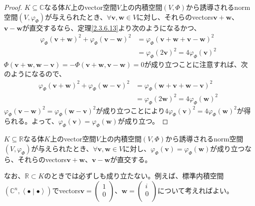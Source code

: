\documentclass[dvipdfmx]{jsarticle}
\begin{document}
\begin{proof}
$K \subseteq \mathbb{C}$なる体$K$上のvector空間$V$上の内積空間$(V,\varPhi)$から誘導されるnorm空間$\left( V,\varphi_{\varPhi} \right)$が与えられたとき、$\forall\mathbf{v},\mathbf{w} \in V$に対し、それらのvectors$\mathbf{v} + \mathbf{w}$、$\mathbf{v} - \mathbf{w}$が直交するなら、定理\ref{2.3.6.13}より次のようになるかつ、
\begin{align*}
{\varphi_{\varPhi}\left( \mathbf{v} + \mathbf{w} \right)}^{2} + {\varphi_{\varPhi}\left( \mathbf{v} - \mathbf{w} \right)}^{2} &= {\varphi_{\varPhi}\left( \mathbf{v} + \mathbf{w} + \mathbf{v} - \mathbf{w} \right)}^{2}\\
&= {\varphi_{\varPhi}\left( 2\mathbf{v} \right)}^{2} = 4{\varphi_{\varPhi}\left( \mathbf{v} \right)}^{2}
\end{align*}
$\varPhi\left( \mathbf{v} + \mathbf{w},\mathbf{w} - \mathbf{v} \right) = - \varPhi\left( \mathbf{v} + \mathbf{w},\mathbf{v} - \mathbf{w} \right) = 0$が成り立つことに注意すれば、次のようになるので、
\begin{align*}
{\varphi_{\varPhi}\left( \mathbf{v} + \mathbf{w} \right)}^{2} + {\varphi_{\varPhi}\left( \mathbf{w} - \mathbf{v} \right)}^{2} &= {\varphi_{\varPhi}\left( \mathbf{w} + \mathbf{v} + \mathbf{w} - \mathbf{v} \right)}^{2}\\
&= {\varphi_{\varPhi}\left( 2\mathbf{w} \right)}^{2} = 4{\varphi_{\varPhi}\left( \mathbf{w} \right)}^{2}
\end{align*}
${\varphi_{\varPhi}\left( \mathbf{v} - \mathbf{w} \right)}^{2} = {\varphi_{\varPhi}\left( \mathbf{w} - \mathbf{v} \right)}^{2}$が成り立つことにより$4{\varphi_{\varPhi}\left( \mathbf{v} \right)}^{2} = 4{\varphi_{\varPhi}\left( \mathbf{w} \right)}^{2}$が得られる。よって、$\varphi_{\varPhi}\left( \mathbf{v} \right) = \varphi_{\varPhi}\left( \mathbf{w} \right)$が成り立つ。
\end{proof}
\begin{thm}\label{2.3.6.16}
$K \subseteq \mathbb{R}$なる体$K$上のvector空間$V$上の内積空間$(V,\varPhi)$から誘導されるnorm空間$\left( V,\varphi_{\varPhi} \right)$が与えられたとき、$\forall\mathbf{v},\mathbf{w} \in V$に対し、$\varphi_{\varPhi}\left( \mathbf{v} \right) = \varphi_{\varPhi}\left( \mathbf{w} \right)$が成り立つなら、それらのvectors$\mathbf{v} + \mathbf{w}$、$\mathbf{v} - \mathbf{w}$が直交する。\par
なお、$\mathbb{R} \subset K$のときでは必ずしも成り立たない。例えば、標準内積空間$\left( \mathbb{C}^{n},\left\langle \bullet \middle| \bullet \right\rangle \right)$でvectors$\mathbf{v} = \begin{pmatrix}
1 \\
0 \\
\end{pmatrix}$、$\mathbf{w} = \begin{pmatrix}
i \\
0 \\
\end{pmatrix}$について考えればよい。
\end{thm}
\end{document}
